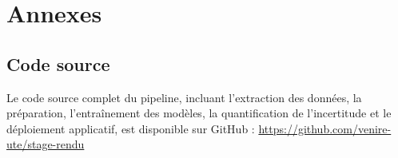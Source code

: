 \documentclass[12pt,a4paper,oneside]{report}
\begin{document}
\appendix
\chapter*{Annexes}

\section*{Code source}
Le code source complet du pipeline, incluant l’extraction des données, la préparation, l’entraînement des modèles, la quantification de l’incertitude et le déploiement applicatif, est disponible sur GitHub : \url{https://github.com/venire-ute/stage-rendu}
\nocite{*}
\printbibliography
\end{document}
